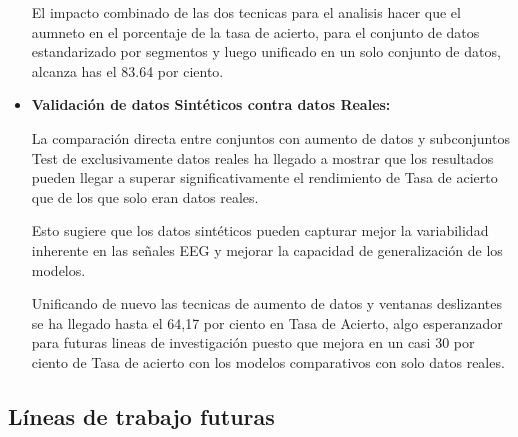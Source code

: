 \begin{itemize}

	
	El impacto combinado de las dos tecnicas para el analisis hacer que el aumneto en el porcentaje de la tasa de acierto, para el conjunto de datos estandarizado por segmentos y luego unificado en un solo conjunto de datos, alcanza has el 83.64 por ciento.
	
	
	\item
	\textbf{Validación de datos Sintéticos contra datos Reales:}


	La comparación directa entre conjuntos con aumento de datos y subconjuntos Test de exclusivamente datos reales ha llegado a mostrar que los resultados  pueden llegar a superar significativamente el rendimiento de Tasa de acierto que de los que solo eran datos reales. 
	
	Esto sugiere que los datos sintéticos pueden capturar mejor la variabilidad inherente en las señales EEG y mejorar la capacidad de generalización de los modelos.
	
	Unificando de nuevo las tecnicas de aumento de datos y ventanas deslizantes se ha llegado hasta el 64,17 por ciento en Tasa de Acierto, algo esperanzador para futuras lineas de investigación puesto que mejora en un casi 30 por ciento de Tasa de acierto con los modelos comparativos con solo datos reales.


\end{itemize}

\subsection{Líneas de trabajo futuras}


